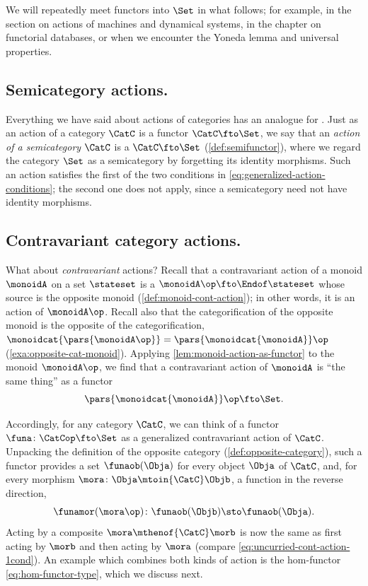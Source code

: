 We will repeatedly meet functors into $\Set$ in what follows; for example, in the section on actions of machines and dynamical systems, in the chapter on functorial databases, or when we encounter the Yoneda lemma and universal properties. 


\subsection{Semicategory actions.}
\label{sec:semicategory-actions}
Everything we have said about actions of categories has an analogue for .
Just as an action of a category $\CatC$ is a functor $\CatC \fto \Set$, we say that an \emph{action of a semicategory} $\CatC$ is a  $\CatC \fto \Set$ (\cref{def:semifunctor}), where we regard the category $\Set$ as a semicategory by forgetting its identity morphisms.
Such an action satisfies the first of the two conditions in \cref{eq:generalized-action-conditions}; the second one does not apply, since a semicategory need not have identity morphisms.


\subsection{Contravariant category actions.}
What about \emph{contravariant} actions?
Recall that a contravariant action of a monoid $\monoidA$ on a set $\stateset$ is a  $\monoidA\op \fto \Endof\stateset$ whose source is the opposite monoid (\cref{def:monoid-cont-action}); in other words, it is an action of $\monoidA\op$.
Recall also that the categorification of the opposite monoid is the opposite of the categorification, $\monoidcat{\pars{\monoidA\op}} = \pars{\monoidcat{\monoidA}}\op$ (\cref{exa:opposite-cat-monoid}).
Applying \cref{lem:monoid-action-as-functor} to the monoid $\monoidA\op$, we find that a contravariant action of $\monoidA$ is ``the same thing'' as a functor
\begin{equation}
    \pars{\monoidcat{\monoidA}}\op \fto \Set.
\end{equation}

Accordingly, for any category $\CatC$, we can think of a functor $\funa \colon \CatCop \fto \Set$ as a generalized contravariant action of $\CatC$.
Unpacking the definition of the opposite category (\cref{def:opposite-category}), such a functor provides a set $\funaob(\Obja)$ for every object $\Obja$ of $\CatC$, and, for every morphism $\mora \colon \Obja \mtoin{\CatC} \Objb$, a function in the reverse direction,
\begin{equation}
    \funamor(\mora\op) \colon \funaob(\Objb) \sto \funaob(\Obja).
\end{equation}
Acting by a composite $\mora \mthenof{\CatC} \morb$ is now the same as first acting by $\morb$ and then acting by $\mora$ (compare \cref{eq:uncurried-cont-action-1cond}).
An example which combines both kinds of action is the hom-functor \cref{eq:hom-functor-type}, which we discuss next.


